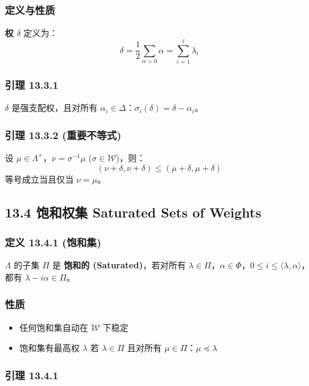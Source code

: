 \subsubsection{定义与性质}

\textbf{权 $\delta$} 定义为：
\[
\delta = \frac{1}{2}\sum_{\alpha>0} \alpha = \sum_{i=1}^\ell \lambda_i
\]

\subsubsection{引理 13.3.1}

$\delta$ 是强支配权，且对所有 $\alpha_i \in \Delta$：$\sigma_i(\delta) = \delta - \alpha_i$。

\subsubsection{引理 13.3.2 (重要不等式)}

设 $\mu \in \Lambda^+$，$\nu = \sigma^{-1}\mu$ ($\sigma \in \mathcal{W}$)，则：
\[
(\nu + \delta, \nu + \delta) \leq (\mu + \delta, \mu + \delta)
\]
等号成立当且仅当 $\nu = \mu$。

\subsection{13.4 饱和权集 Saturated Sets of Weights}

\subsubsection{定义 13.4.1 (饱和集)}

$\Lambda$ 的子集 $\Pi$ 是 \textbf{饱和的 (Saturated)}，若对所有 $\lambda \in \Pi$，$\alpha \in \Phi$，$0 \leq i \leq \langle\lambda, \alpha\rangle$，都有 $\lambda - i\alpha \in \Pi$。

\subsubsection{性质}

\begin{itemize}
	\item 任何饱和集自动在 $\mathcal{W}$ 下稳定
	\item 饱和集有最高权 $\lambda$ 若 $\lambda \in \Pi$ 且对所有 $\mu \in \Pi$：$\mu \preceq \lambda$
\end{itemize}

\subsubsection{引理 13.4.1}


